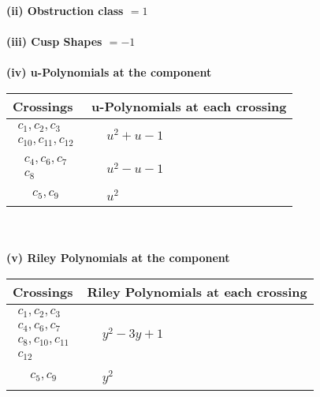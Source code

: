 \documentclass[1p]{elsarticle_modified}
\theoremstyle{definition}
\begin{document}
\flushleft \textbf{(ii) Obstruction class $= 1$}\\~\\
\flushleft \textbf{(iii) Cusp Shapes $= -1$}\\~\\
\newpage\renewcommand{\arraystretch}{1}
\flushleft \textbf{(iv) u-Polynomials at the component}\newline \\
\begin{tabular}{m{50pt}|m{274pt}}
Crossings & \hspace{64pt}u-Polynomials at each crossing \\
\hline $$\begin{aligned}c_{1},c_{2},c_{3}\\c_{10},c_{11},c_{12}\end{aligned}$$&$\begin{aligned}
&u^2+u-1
\end{aligned}$\\
\hline $$\begin{aligned}c_{4},c_{6},c_{7}\\c_{8}\end{aligned}$$&$\begin{aligned}
&u^2- u-1
\end{aligned}$\\
\hline $$\begin{aligned}c_{5},c_{9}\end{aligned}$$&$\begin{aligned}
&u^2
\end{aligned}$\\
\hline
\end{tabular}\\~\\
\newpage\renewcommand{\arraystretch}{1}
\flushleft \textbf{(v) Riley Polynomials at the component}\newline \\
\begin{tabular}{m{50pt}|m{274pt}}
Crossings & \hspace{64pt}Riley Polynomials at each crossing \\
\hline $$\begin{aligned}c_{1},c_{2},c_{3}\\c_{4},c_{6},c_{7}\\c_{8},c_{10},c_{11}\\c_{12}\end{aligned}$$&$\begin{aligned}
&y^2-3 y+1
\end{aligned}$\\
\hline $$\begin{aligned}c_{5},c_{9}\end{aligned}$$&$\begin{aligned}
&y^2
\end{aligned}$\\
\hline
\end{tabular}\\~\\
\end{document}
